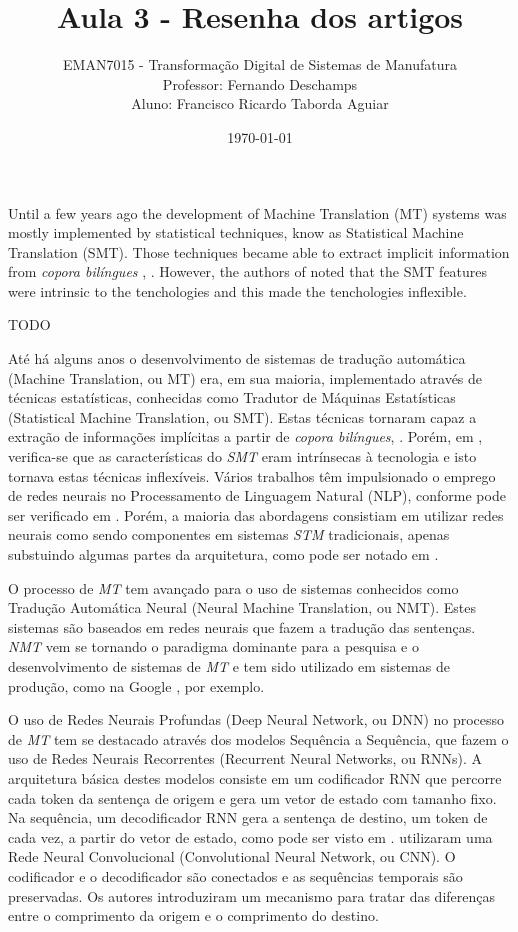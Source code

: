 \documentclass[a4paper]{article}
\title{
    Aula 3 - Resenha dos artigos\\
}
\author{
    {EMAN7015 - Transforma\c c\~ao Digital de Sistemas de Manufatura}\\
    \small{Professor: Fernando Deschamps}\\
    \small{Aluno: Francisco Ricardo Taborda Aguiar}\\    
}
\date{\today}
\begin{document}
    \maketitle

    Until a few years ago the development of Machine Translation (MT) 
    systems was mostly implemented by statistical techniques, know as 
    Statistical Machine Translation (SMT).
    Those techniques became able to extract implicit information from
    \emph{copora bil\'ingues} , \cite{brown:1993}.
    However, the authors of \cite{maruf:2021} noted that the SMT features
    were intrinsic to the tenchologies and this made the tenchologies
    inflexible.

    TODO

    At\'e h\'a alguns anos o desenvolvimento de sistemas de tradu\c c\~ao autom\'atica 
    (Machine Translation, ou MT) era, em sua maioria, implementado atrav\'es de t\'ecnicas 
    estat\'isticas, conhecidas como Tradutor de M\'aquinas Estat\'isticas 
    (Statistical Machine Translation, ou SMT).
    Estas t\'ecnicas tornaram capaz a extra\c c\~ao de informa\c c\~oes impl\'icitas a partir de
    \emph{copora bil\'ingues}, \cite{brown:1993}. Por\'em, em \textcite{maruf:2021}, verifica-se que 
    as caracter\'isticas do \emph{SMT} eram intr\'insecas \`a tecnologia e isto tornava estas 
    t\'ecnicas inflex\'iveis. V\'arios trabalhos t\^em impulsionado o emprego de redes 
    neurais no Processamento de Linguagem Natural (NLP), conforme pode ser verificado em 
    \textcite{goldberg:2016}. Por\'em, a maioria das abordagens consistiam em utilizar redes neurais 
    como sendo componentes em sistemas \emph{STM} tradicionais, apenas substuindo algumas 
    partes da arquitetura, como pode ser notado em \textcite{stahlberg:2020}.
    
    O processo de \emph{MT} tem avan\c cado para o uso de sistemas conhecidos como Tradu\c c\~ao 
    Autom\'atica Neural (Neural Machine Translation, ou NMT).
    Estes sistemas s\~ao baseados em redes neurais que fazem a tradu\c c\~ao das senten\c cas.
    \emph{NMT} vem se tornando o paradigma dominante para a pesquisa e o desenvolvimento 
    de sistemas de \emph{MT} e tem sido utilizado em sistemas de produ\c c\~ao, como na Google
    \cite{wu:2016}, por exemplo.
    
    O uso de Redes Neurais Profundas (Deep Neural Network, ou DNN) no processo de \emph{MT}
    tem se destacado atrav\'es dos modelos Sequ\^encia a Sequ\^encia, que fazem o uso de 
    Redes Neurais Recorrentes (Recurrent Neural Networks, ou RNNs).
    A arquitetura b\'asica destes modelos consiste em um codificador RNN que percorre cada 
    token da senten\c ca de origem e gera um vetor de estado com tamanho fixo.
    Na sequ\^encia, um decodificador RNN gera a senten\c ca de destino, um token de cada vez,
    a partir do vetor de estado, como pode ser visto em \textcite{sutskever:2014}.
    \textcite{kalchbrenner:2016} utilizaram uma Rede Neural Convolucional (Convolutional 
    Neural Network, ou CNN). O codificador e o decodificador s\~ao conectados e as sequ\^encias 
    temporais s\~ao preservadas. Os autores introduziram um mecanismo para tratar das 
    diferen\c cas entre o comprimento da origem e o comprimento do destino.
    
\end{document}
